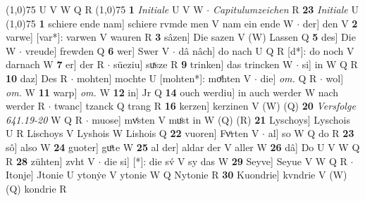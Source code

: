 \documentclass[8pt,a4paper,notitlepage]{article}
\begin{document}
\begin{table}[ht]
\begin{minipage}[t]{0.5\linewidth}
\scriptsize
\line(1,0){75} \newline
U V W Q R \newline
\line(1,0){75} \newline
\textbf{1} \textit{Initiale} U V W   $\cdot$ \textit{Capitulumzeichen} R  \textbf{23} \textit{Initiale} U  \newline
\line(1,0){75} \newline
\textbf{1} schiere ende nam] schiere rvmde men V nam ein ende W  $\cdot$ der] den V \textbf{2} varwe] [var*]: varwen V wauren R \textbf{3} sâzen] Die sazen V (W) Lassen Q \textbf{5} des] Die W  $\cdot$ vreude] frewden Q \textbf{6} wer] Swer V  $\cdot$ dâ nâch] do nach U Q R [d*]: do noch V darnach W \textbf{7} er] der R  $\cdot$ süeziu] suͯsze R \textbf{9} trinken] das trincken W  $\cdot$ si] in W Q R \textbf{10} daz] Des R  $\cdot$ mohten] mochte U [mohten*]: moͤhten V  $\cdot$ die] \textit{om.} Q R  $\cdot$ wol] \textit{om.} W \textbf{11} warp] \textit{om.} W \textbf{12} in] Jr Q \textbf{14} ouch werdiu] in auch werder W nach werder R  $\cdot$ twanc] tzanck Q trang R \textbf{16} kerzen] kerzinen V (W) (Q) \textbf{20} \textit{Versfolge 641.19-20} W Q R   $\cdot$ muose] mvͤsten V muͦst in W (Q) (R) \textbf{21} Lyschoys] Lyschois U R Lischoys V Lyshois W Lishois Q \textbf{22} vuoren] Fvͦrten V  $\cdot$ al] so W Q do R \textbf{23} sô] also W \textbf{24} guoter] guͦte W \textbf{25} al der] aldar der V aller W \textbf{26} dâ] Do U V W Q R \textbf{28} zühten] zvht V  $\cdot$ die si] [*]: die sv́ V sy das W \textbf{29} Seyve] Seyue V W Q R  $\cdot$ Itonje] Jtonie U ytonẏe V ytonie W Q Nytonie R \textbf{30} Kuondrie] kvndrie V (W) (Q) kondrie R \newline
\end{minipage}
\end{table}
\end{document}

